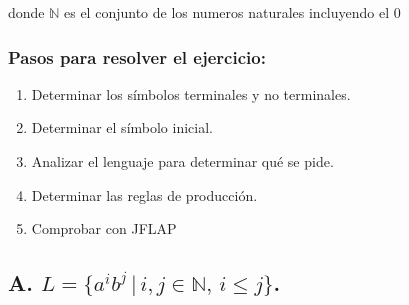 \documentclass{article}
\begin{document}
        \begin{flushleft}
            donde $\mathbb{N}$ es el conjunto de los numeros naturales incluyendo el 0
        \end{flushleft}

        \vspace{\baselineskip} %

        \begin{flushleft}
            
            \subsubsection*{Pasos para resolver el ejercicio:}
                        
            \begin{enumerate}
                \item Determinar los símbolos terminales y no terminales.
                \item Determinar el símbolo inicial.
                \item Analizar el lenguaje para determinar qué se pide.
                \item Determinar las reglas de producción.
                \item Comprobar con JFLAP  
            \end{enumerate}
        \end{flushleft}


        \newpage


        \subsection*{A. $L = \{a^i b^j \, | \, i, j \in \mathbb{N}, \, i \leq j\}$.}
\end{document}
